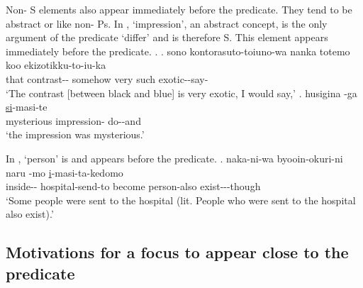 Non- S elements also appear immediately before the predicate.
They tend to be abstract or  like non- Ps.
In \Next,
 `impression', an abstract concept, is the only argument of the predicate  `differ' and is therefore S.
This element appears immediately before the predicate.
%
\ex.\label{S00F0014_kanzi}
 \ag. sono kontorasuto-toiuno-wa nanka totemo koo ekizotikku-to-iu-ka \\
 	that contrast-- somehow very such exotic--say- \\
	`The contrast [between black and blue] is very exotic, I would say,'
 \bg. husigina -ga \ul{si}-masi-te \\
 		mysterious impression- do--and \\
		`the impression was mysterious.'
%

In \Next,
 `person' is  and appears before the predicate.
\exg. naka-ni-wa byooin-okuri-ni naru -mo \ul{i}-masi-ta-kedomo \\
		inside-- hospital-send-to become person-also exist---though \\
		`Some people were sent to the hospital (lit. People who were sent to the hospital also exist).'


\subsection{Motivations for a focus to appear close to the predicate}\label{WO:PreP:Motivation}

